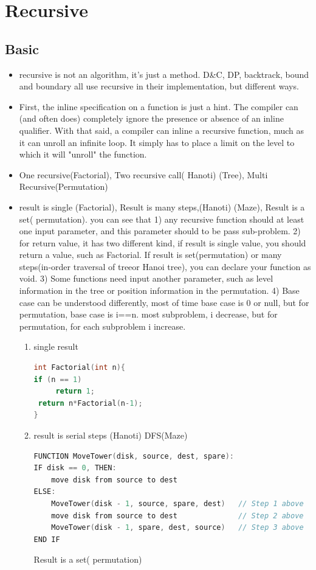 \documentclass[a4paper,11pt,twoside]{book}
\begin{document}
\section{Recursive}
\subsection{Basic}
\begin{itemize}

	\item recursive is not an algorithm, it's just a method. D\&C, DP, backtrack, bound and boundary all use recursive in their implementation, but different ways. 
	
	\item First, the inline specification on a function is just a hint. The compiler can (and often does) completely ignore the presence or absence of an inline qualifier. With that said, a compiler can inline a recursive function, much as it can unroll an infinite loop. It simply has to place a limit on the level to which it will "unroll" the function.

	\item One recursive(Factorial),  Two recursive call( Hanoti) (Tree), Multi Recursive(Permutation)

	\item result is single (Factorial), Result is many steps,(Hanoti) (Maze), Result is a set( permutation). you can see that 1) any recursive function should at least one input parameter, and this parameter should to be pass sub-problem. 2) for return value, it has two different kind, if result is single value, you should return a value, such as Factorial. If result is set(permutation) or many steps(in-order traversal of treeor Hanoi tree), you can declare your function as void. 3) Some functions need input another parameter, such as level information in the tree or position information in the permutation. 4) Base case can be understood differently, most of time base case is 0 or null, but for permutation, base case is i==n.  most subproblem, i decrease, but for permutation, for each subproblem i increase. 
\begin{enumerate}
\item single result 
\begin{lstlisting}[frame=single, language=c++]
int Factorial(int n){
if (n == 1) 
     return 1;
 return n*Factorial(n-1);
}
\end{lstlisting}

	\item result is serial steps (Hanoti) DFS(Maze)
\begin{lstlisting}[frame=single, language=c++]
FUNCTION MoveTower(disk, source, dest, spare):
IF disk == 0, THEN:
    move disk from source to dest
ELSE:
    MoveTower(disk - 1, source, spare, dest)   // Step 1 above
    move disk from source to dest              // Step 2 above
    MoveTower(disk - 1, spare, dest, source)   // Step 3 above
END IF
\end{lstlisting}
Result is a set( permutation)


\end{enumerate}
\end{itemize}
\end{document}
